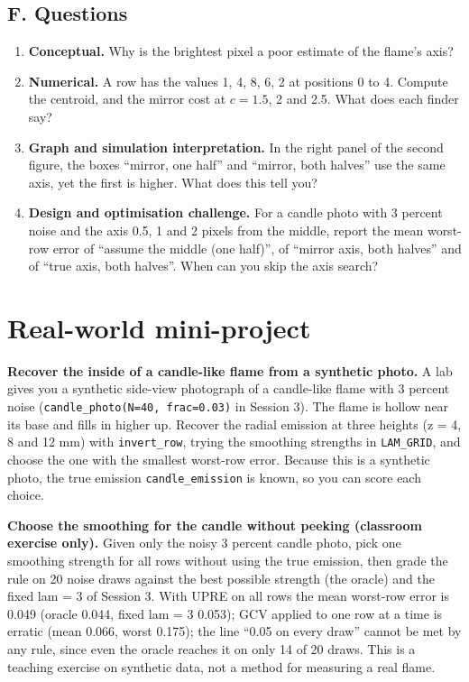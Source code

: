 \documentclass[11pt,a4paper]{article}
\begin{document}
\subsection*{F. Questions}
\begin{enumerate}[nosep]
\item \textbf{Conceptual.} Why is the brightest pixel a poor estimate of the flame's axis?
\item \textbf{Numerical.} A row has the values 1, 4, 8, 6, 2 at positions 0 to 4. Compute the centroid, and the mirror cost at $c = 1.5$, 2 and 2.5. What does each finder say?
\item \textbf{Graph and simulation interpretation.} In the right panel of the second figure, the boxes ``mirror, one half'' and ``mirror, both halves'' use the same axis, yet the first is higher. What does this tell you?
\item \textbf{Design and optimisation challenge.} For a candle photo with 3 percent noise and the axis 0.5, 1 and 2 pixels from the middle, report the mean worst-row error of ``assume the middle (one half)'', of ``mirror axis, both halves'' and of ``true axis, both halves''. When can you skip the axis search?
\end{enumerate}

\section{Real-world mini-project}
\textbf{Recover the inside of a candle-like flame from a synthetic photo.} A lab gives you a synthetic side-view photograph of a candle-like flame with 3 percent noise (\texttt{candle\_photo(N=40, frac=0.03)} in Session 3). The flame is hollow near its base and fills in higher up. Recover the radial emission at three heights (z = 4, 8 and 12 mm) with \texttt{invert\_row}, trying the smoothing strengths in \texttt{LAM\_GRID}, and choose the one with the smallest worst-row error. Because this is a synthetic photo, the true emission \texttt{candle\_emission} is known, so you can score each choice.

\textbf{Choose the smoothing for the candle without peeking (classroom exercise only).} Given only the noisy 3 percent candle photo, pick one smoothing strength for all rows without using the true emission, then grade the rule on 20 noise draws against the best possible strength (the oracle) and the fixed lam = 3 of Session 3. With UPRE on all rows the mean worst-row error is 0.049 (oracle 0.044, fixed lam = 3 0.053); GCV applied to one row at a time is erratic (mean 0.066, worst 0.175); the line ``0.05 on every draw'' cannot be met by any rule, since even the oracle reaches it on only 14 of 20 draws. This is a teaching exercise on synthetic data, not a method for measuring a real flame.
\end{document}
